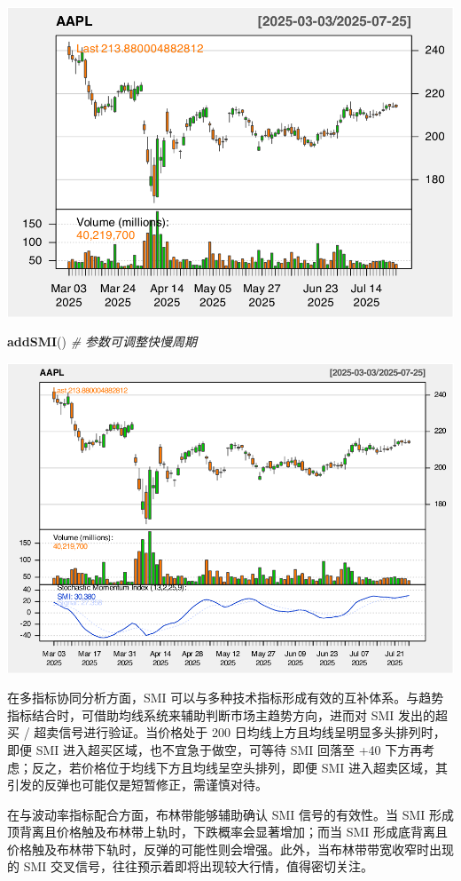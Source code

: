 \documentclass[]{ctexbook}
\newenvironment{Shaded}{\begin{snugshade}}{\end{snugshade}}
\newcommand{\CommentTok}[1]{\textcolor[rgb]{0.56,0.35,0.01}{\textit{#1}}}
\newcommand{\FunctionTok}[1]{\textcolor[rgb]{0.13,0.29,0.53}{\textbf{#1}}}
\newcommand{\NormalTok}[1]{#1}
\begin{document}
\includegraphics[width=0.9\linewidth]{QuantmodHandbook_files/figure-latex/smi-1}

\begin{Shaded}
\begin{Highlighting}[]
\FunctionTok{addSMI}\NormalTok{()  }\CommentTok{\# 参数可调整快慢周期}
\end{Highlighting}
\end{Shaded}

\includegraphics[width=0.9\linewidth]{QuantmodHandbook_files/figure-latex/smi-2}

在多指标协同分析方面，SMI 可以与多种技术指标形成有效的互补体系。与趋势指标结合时，可借助均线系统来辅助判断市场主趋势方向，进而对 SMI 发出的超买 / 超卖信号进行验证。当价格处于 200 日均线上方且均线呈明显多头排列时，即便 SMI 进入超买区域，也不宜急于做空，可等待 SMI 回落至 +40 下方再考虑；反之，若价格位于均线下方且均线呈空头排列，即便 SMI 进入超卖区域，其引发的反弹也可能仅是短暂修正，需谨慎对待。

在与波动率指标配合方面，布林带能够辅助确认 SMI 信号的有效性。当 SMI 形成顶背离且价格触及布林带上轨时，下跌概率会显著增加；而当 SMI 形成底背离且价格触及布林带下轨时，反弹的可能性则会增强。此外，当布林带带宽收窄时出现的 SMI 交叉信号，往往预示着即将出现较大行情，值得密切关注。
\end{document}
